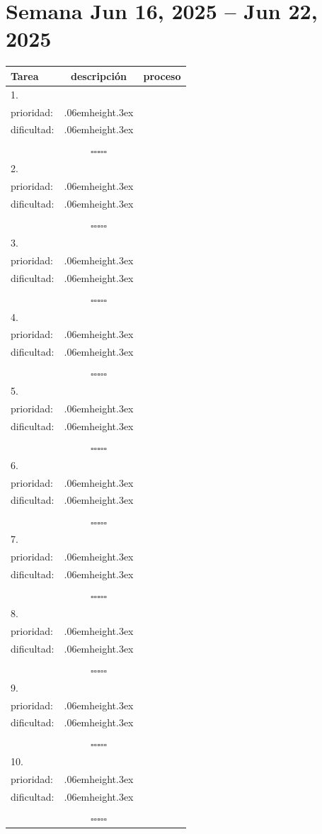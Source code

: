 \documentclass[twoside, a4paper,12pt, tikz]{scrartcl}
\newcommand\Vtextvisiblespace[1][.3em]{%
  \mbox{\kern.06em\vrule height.3ex}%
  \vbox{\hrule width#1}%
  \hbox{\vrule height.3ex}}
\newcommand{\subtablaDescrip}{ \begin{tabular}{ll}&\\ prioridad: & \Vtextvisiblespace[2em] \\ dificultad: & \Vtextvisiblespace[2em]\\&\\ \end{tabular}}
\begin{document}
\section*{Semana Jun 16, 2025 -- Jun 22, 2025}
\thispagestyle{empty}
\noindent
\begin{tabularx}{\linewidth}{|X|c c|}
    \hline
  \textbf{Tarea} & \textbf{descripción} & \textbf{proceso}\\
  \hline
   1.\vspace{4ex} &      \subtablaDescrip     & $\square\square\square\square\square$ \\
  \hline
  2.\vspace{4ex} &      \subtablaDescrip     & $\square\square\square\square\square$ \\
  \hline
  3.\vspace{4ex} &      \subtablaDescrip     & $\square\square\square\square\square$ \\
  \hline
  4.\vspace{4ex} &      \subtablaDescrip     & $\square\square\square\square\square$ \\
  \hline
  5.\vspace{4ex} &      \subtablaDescrip     & $\square\square\square\square\square$ \\
  \hline
  6.\vspace{4ex} &      \subtablaDescrip     & $\square\square\square\square\square$ \\
  \hline
  7.\vspace{4ex} &      \subtablaDescrip     & $\square\square\square\square\square$ \\
  \hline
  8.\vspace{4ex} &      \subtablaDescrip     & $\square\square\square\square\square$ \\
  \hline
  9.\vspace{4ex} &      \subtablaDescrip     & $\square\square\square\square\square$ \\
  \hline
  10.\vspace{4ex} &      \subtablaDescrip     & $\square\square\square\square\square$ \\
  \hline
\end{tabularx}

\newpage
\end{document}
